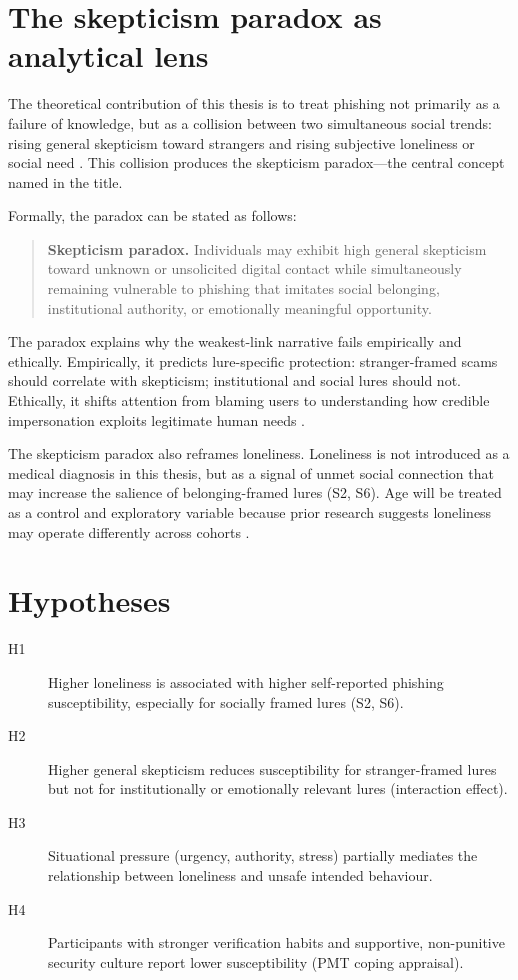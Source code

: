 \documentclass[UKenglish,12pt]{master-style}
\begin{document}
\section{The skepticism paradox as analytical lens}

The theoretical contribution of this thesis is to treat phishing not primarily as a failure of knowledge, but as a collision between two simultaneous social trends: rising general skepticism toward strangers and rising subjective loneliness or social need \parencite{ssb2025loneliness,khrono2024students,wired2024loneliness}. This collision produces the skepticism paradox---the central concept named in the title.

Formally, the paradox can be stated as follows:

\begin{quote}
\textbf{Skepticism paradox.} Individuals may exhibit high general skepticism toward unknown or unsolicited digital contact while simultaneously remaining vulnerable to phishing that imitates social belonging, institutional authority, or emotionally meaningful opportunity.
\end{quote}

The paradox explains why the weakest-link narrative fails empirically and ethically. Empirically, it predicts lure-specific protection: stranger-framed scams should correlate with skepticism; institutional and social lures should not. Ethically, it shifts attention from blaming users to understanding how credible impersonation exploits legitimate human needs \parencite{cacioppo2008loneliness,kluetsch2024friend}.

The skepticism paradox also reframes loneliness. Loneliness is not introduced as a medical diagnosis in this thesis, but as a signal of unmet social connection that may increase the salience of belonging-framed lures (S2, S6). Age will be treated as a control and exploratory variable because prior research suggests loneliness may operate differently across cohorts \parencite{wen2024loneliness,barstad2021ensomme}.

\section{Hypotheses}

\begin{description}
    \item[H1] Higher loneliness is associated with higher self-reported phishing susceptibility, especially for socially framed lures (S2, S6).
    \item[H2] Higher general skepticism reduces susceptibility for stranger-framed lures but not for institutionally or emotionally relevant lures (interaction effect).
    \item[H3] Situational pressure (urgency, authority, stress) partially mediates the relationship between loneliness and unsafe intended behaviour.
    \item[H4] Participants with stronger verification habits and supportive, non-punitive security culture report lower susceptibility (PMT coping appraisal).
\end{description}
\end{document}
